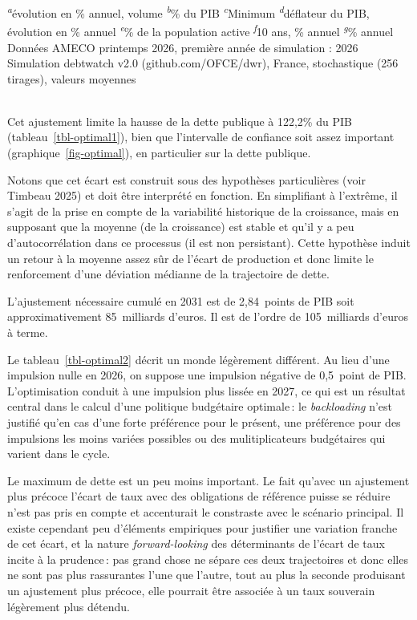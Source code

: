 \documentclass[
  french,
  9pt,
  a4paper,
  DIV=11,
  twoside=semi]{scrreprt}
\begin{document}
\begin{table}
{\begin{minipage}{\linewidth}
\vspace{.05em}
\textsuperscript{\textit{a}}évolution en \% annuel, volume \textsuperscript{\textit{b}}\% du PIB \textsuperscript{\textit{c}}Minimum \textsuperscript{\textit{d}}déflateur du PIB, évolution en \% annuel \textsuperscript{\textit{e}}\% de la population active \textsuperscript{\textit{f}}10 ans, \% annuel \textsuperscript{\textit{g}}\% annuel\\
Données AMECO printemps 2026, première année de simulation : 2026\\
Simulation debtwatch v2.0 (github.com/OFCE/dwr), France, stochastique (256 tirages), valeurs moyennes\\
\\
\end{minipage}

}

\end{table}%

Cet ajustement limite la hausse de la dette publique à 122,2\% du PIB
(tableau~\ref{tbl-optimal1}), bien que l'intervalle de confiance soit
assez important (graphique~\ref{fig-optimal}), en particulier sur la
dette publique.

Notons que cet écart est construit sous des hypothèses particulières
(voir Timbeau 2025) et doit être interprété en fonction. En simplifiant
à l'extrême, il s'agit de la prise en compte de la variabilité
historique de la croissance, mais en supposant que la moyenne (de la
croissance) est stable et qu'il y a peu d'autocorrélation dans ce
processus (il est non persistant). Cette hypothèse induit un retour à la
moyenne assez sûr de l'écart de production et donc limite le
renforcement d'une déviation médianne de la trajectoire de dette.

L'ajustement nécessaire cumulé en 2031 est de 2,84~points de PIB soit
approximativement 85~milliards d'euros. Il est de l'ordre de
105~milliards d'euros à terme.

Le tableau~\ref{tbl-optimal2} décrit un monde légèrement différent. Au
lieu d'une impulsion nulle en 2026, on suppose une impulsion négative de
0,5~point de PIB. L'optimisation conduit à une impulsion plus lissée en
2027, ce qui est un résultat central dans le calcul d'une politique
budgétaire optimale\,: le \emph{backloading} n'est justifié qu'en cas
d'une forte préférence pour le présent, une préférence pour des
impulsions les moins variées possibles ou des mulitiplicateurs
budgétaires qui varient dans le cycle.

Le maximum de dette est un peu moins important. Le fait qu'avec un
ajustement plus précoce l'écart de taux avec des obligations de
référence puisse se réduire n'est pas pris en compte et accenturait le
constraste avec le scénario principal. Il existe cependant peu
d'éléments empiriques pour justifier une variation franche de cet écart,
et la nature \emph{forward-looking} des déterminants de l'écart de taux
incite à la prudence\,: pas grand chose ne sépare ces deux trajectoires
et donc elles ne sont pas plus rassurantes l'une que l'autre, tout au
plus la seconde produisant un ajustement plus précoce, elle pourrait
être associée à un taux souverain légèrement plus détendu.
\end{document}
